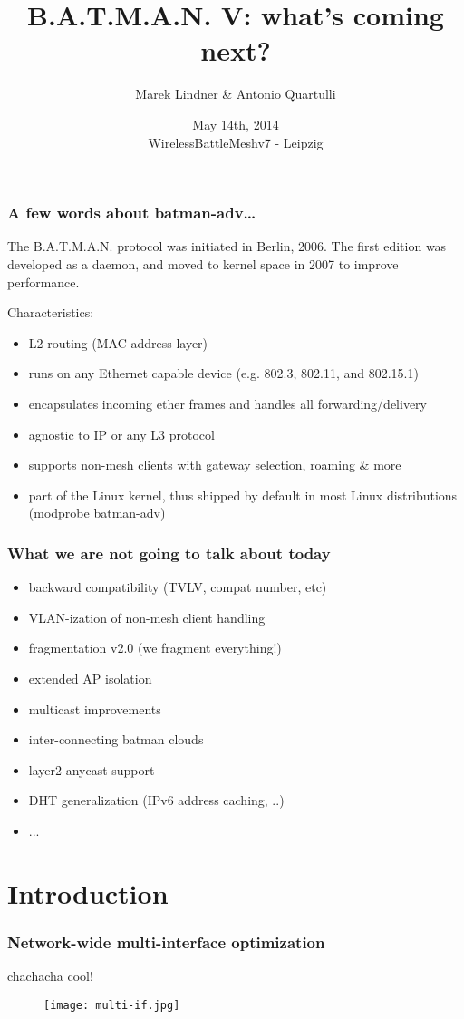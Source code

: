 \documentclass[slidestop]{beamer}
\title[B.A.T.M.A.N. V: what's coming next?]{B.A.T.M.A.N. V: what's coming next?}
\author{Marek Lindner \& Antonio Quartulli}
\date{May 14th, 2014\\WirelessBattleMeshv7 - Leipzig}
\institute[]{B.A.T.M.A.N.-Advanced\\www.open-mesh.org}
\begin{document}
\begin{frame}
	\titlepage
\end{frame}

\begin{frame}[c]
	\frametitle{A few words about batman-adv\dots}

	The B.A.T.M.A.N. protocol was initiated in Berlin, 2006. The first edition was developed as a daemon, and moved to kernel space in 2007 to improve performance.

	Characteristics:
	\begin{itemize}
		\item L2 routing (MAC address layer)
		\item runs on any Ethernet capable device (e.g. 802.3, 802.11, and 802.15.1)
		\item encapsulates incoming ether frames and handles all forwarding/delivery
		\item agnostic to IP or any L3 protocol
		\item supports non-mesh clients with gateway selection, roaming \& more
		\item part of the Linux kernel, thus shipped by default in most Linux distributions (modprobe batman-adv)
	\end{itemize}
\end{frame}

\begin{frame}[c]
	\frametitle{What we are not going to talk about today}
	\begin{itemize}
		\item backward compatibility (TVLV, compat number, etc)
		\item VLAN-ization of non-mesh client handling
		\item fragmentation v2.0 (we fragment everything!)
		\item extended AP isolation
		\item multicast improvements
		\item inter-connecting batman clouds
		\item layer2 anycast support
		\item DHT generalization (IPv6 address caching, ..)
		\item ...
	\end{itemize}
\end{frame}

\section{Introduction}
\begin{frame}[c]
	\frametitle{Network-wide multi-interface optimization}
	chachacha cool!
	\begin{figure}
		\centering
		\texttt{[image: multi-if.jpg]}
	\end{figure}
\end{frame}
\end{document}
